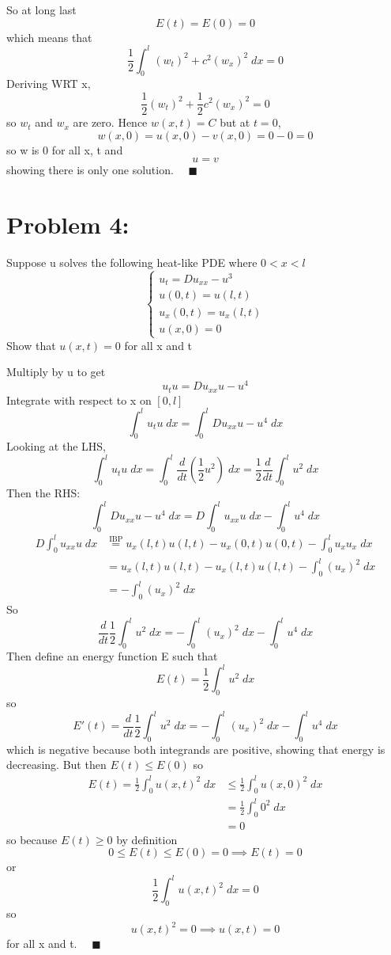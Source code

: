 \documentclass[12pt]{article}
\newcommand{\qed}{\quad \blacksquare}
\begin{document}
So at long last 
\[E(t) = E(0) = 0\]
which means that 
\[\frac{1}{2}\int_0^l (w_t)^2 + c^2(w_x)^2 \; dx = 0\]
Deriving WRT x, 
\[\frac{1}{2}(w_t)^2 + \frac{1}{2}c^2(w_x)^2 = 0\]
so $w_t$ and $w_x$ are zero. Hence $w(x, t) = C$ but at $t = 0$, 
\[w(x, 0) = u(x, 0) - v(x, 0) = 0 - 0 = 0\]
so w is 0 for all x, t and 
\[u = v\]
showing there is only one solution. $\qed$
\pagebreak
\color{black}
\section*{Problem 4:}
Suppose u solves the following heat-like PDE where $0 < x < l$
\[\begin{cases}
    u_t = Du_{xx} - u^3\\
    u(0, t) = u(l, t)\\
    u_x(0, t) = u_x(l, t)\\
    u(x, 0) = 0
\end{cases}\]
Show that $u(x, t) = 0$ for all x and t 

\color{blue}
Multiply by u to get 
\[u_tu = Du_{xx}u - u^4\]
Integrate with respect to x on $[0, l]$
\[\int_0^l u_tu \; dx = \int_0^l Du_{xx}u - u^4 \; dx \]
Looking at the LHS, 
\[\int_0^l u_tu \; dx = \int_0^l \frac{d}{dt}\left(\frac{1}{2}u^2\right)\; dx = \frac{1}{2}\frac{d}{dt} \int_0^l u^2 \; dx\]
Then the RHS:
\[\int_0^l Du_{xx}u - u^4 \; dx = D\int_0^l u_{xx}u \; dx - \int_0^l u^4 \; dx\]
\begin{align*}
    D\int_0^l u_{xx}u \; dx &\overset{\text{IBP}}{=} u_x(l, t)u(l, t)- u_x(0, t)u(0, t) - \int_0^l u_x u_x \; dx\\
    &= u_x(l, t)u(l, t) - u_x(l, t)u(l, t) - \int_0^l (u_x)^2 \; dx\\
    &= - \int_0^l (u_x)^2 \; dx
\end{align*}
So 
\[\frac{d}{dt} \frac{1}{2}\int_0^l u^2 \; dx = - \int_0^l (u_x)^2 \; dx - \int_0^l u^4 \; dx\]
Then define an energy function E such that 
\[E(t) = \frac{1}{2}\int_0^l u^2 \; dx\]
so 
\[E'(t) = \frac{d}{dt} \frac{1}{2}\int_0^l u^2 \; dx = - \int_0^l (u_x)^2 \; dx - \int_0^l u^4 \; dx\]
which is negative because both integrands are positive, showing that energy is decreasing. But then $E(t) \leq E(0)$ so 
\begin{align*}
    E(t) = \frac{1}{2}\int_0^l u(x,t)^2 \; dx &\leq \frac{1}{2}\int_0^l u(x, 0)^2 \; dx\\
    &= \frac{1}{2}\int_0^l 0^2 \; dx \\
    &= 0 
\end{align*}
so because $E(t) \geq 0$ by definition
\[0 \leq E(t) \leq E(0) = 0 \implies E(t) = 0\]
or 
\[\frac{1}{2}\int_0^l u(x,t)^2 \; dx = 0\]
so 
\[u(x, t)^2 = 0 \implies u(x, t) = 0\]
for all x and t. $\quad \blacksquare$
\color{black}
\pagebreak
\end{document}
